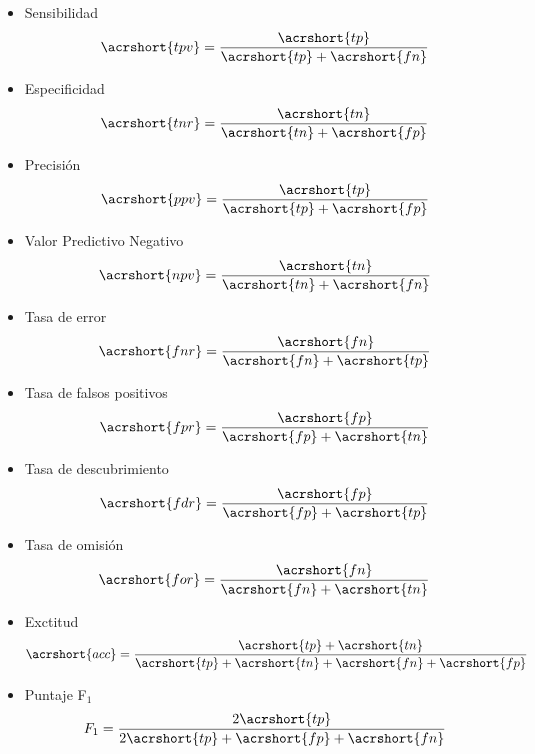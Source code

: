 \begin{itemize}
    \item Sensibilidad
    \begin{align}
        \acrshort{tpv} = \frac{\acrshort{tp}}{\acrshort{tp}+\acrshort{fn}}
    \end{align}
    
    \item Especificidad
    \begin{align}
        \acrshort{tnr} = \frac{\acrshort{tn}}{\acrshort{tn}+\acrshort{fp}}
    \end{align}
    
    \item Precisión
    \begin{align}
        \acrshort{ppv} = \frac{\acrshort{tp}}{\acrshort{tp}+\acrshort{fp}}
    \end{align}
    
    \item Valor Predictivo Negativo
    \begin{align}
        \acrshort{npv} = \frac{\acrshort{tn}}{\acrshort{tn}+\acrshort{fn}}
    \end{align}
    
    \item Tasa de error
    \begin{align}
        \acrshort{fnr} = \frac{\acrshort{fn}}{\acrshort{fn}+\acrshort{tp}}
    \end{align}
    
    \item Tasa de falsos positivos
    \begin{align}
        \acrshort{fpr} = \frac{\acrshort{fp}}{\acrshort{fp}+\acrshort{tn}}
    \end{align}
    
    \item Tasa de descubrimiento
    \begin{align}
        \acrshort{fdr} = \frac{\acrshort{fp}}{\acrshort{fp}+\acrshort{tp}}
    \end{align}
    
    \item Tasa de omisión
    \begin{align}
        \acrshort{for} = \frac{\acrshort{fn}}{\acrshort{fn}+\acrshort{tn}}
    \end{align}
    
    \item Exctitud
    \begin{align}
        \acrshort{acc} = \frac{\acrshort{tp}+\acrshort{tn}}{\acrshort{tp}+\acrshort{tn}+\acrshort{fn}+\acrshort{fp}}
    \end{align}
    
    \item Puntaje F$_1$
    \begin{align}
        F_1 = \frac{2\acrshort{tp}}{2\acrshort{tp}+\acrshort{fp}+\acrshort{fn}}
    \end{align}
    
\end{itemize}

